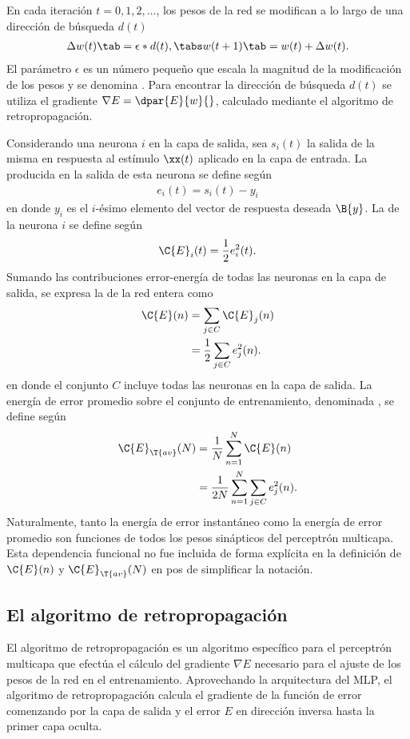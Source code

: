 En cada iteración $t=0,1,2,\ldots$, los pesos de la red
se modifican a lo largo de una dirección de búsqueda
$d(t)$ %
%
\begin{align}
  \Delta w(t)\tab=\epsilon * d(t), \tabs w(t+1) \tab= w(t)+\Delta w(t).
\end{align}
%
El parámetro $\epsilon$ es un número pequeño que escala la magnitud de
la modificación de los pesos y se denomina .  Para encontrar la dirección de búsqueda $d(t)$ se
utiliza el gradiente $\nabla{}E=\dpar{E}{w}{}$, calculado mediante el
algoritmo de retropropagación.

Considerando una neurona $i$ en la capa de salida, sea $s_i(t)$ la
salida de la misma en respuesta al estímulo $\xx(t)$ aplicado en la
capa de entrada. La  producida en la salida de esta
neurona se define según
%
\begin{align}\label{4.2}
  e_i(t)=s_{i}(t)-y_{i}
\end{align}
%
en donde $y_{i}$ es el $i$-ésimo elemento del vector de respuesta
deseada $\B{y}$. La  de la neurona
$i$ se define según
%
\begin{align}
\label{4.3}
  \C{E}_i(t)=\frac{1}{2}e^2_i(t).
\end{align}
%
Sumando las contribuciones error-energía de todas las neuronas en la
capa de salida, se expresa la 
de la red entera como
%
\begin{align}
\label{4.4}
  \C{E}(n)&=\sum_{j\in C}\C{E}_j(n) \\
  &=\frac{1}{2}\sum_{j\in C}e^2_j(n).
\end{align}
%
en donde el conjunto $C$ incluye todas las neuronas en la capa de
salida. La energía de error promedio sobre el conjunto de entrenamiento,
denominada , se define según
%
\begin{align}
\label{4.5}
  \C{E}_{\T{av}}(N)&=\frac{1}{N}\sum_{n=1}^N\C{E}(n) \\
  &=\frac{1}{2N} \sum_{n=1}^N \sum_{j\in C}e^2_j(n).
\end{align}
%
Naturalmente, tanto la energía de error instantáneo como la energía de
error promedio son funciones de todos los pesos sinápticos del
perceptrón multicapa. Esta dependencia funcional no fue incluida de
forma explícita en la definición de $\C{E}(n)$ y $\C{E}_{\T{av}}(N)$
en pos de simplificar la notación.
%
%
\subsection{El algoritmo de retropropagación}
%
El algoritmo de retropropagación es un algoritmo específico para el
perceptrón multicapa que efectúa el cálculo del gradiente $\nabla E$
necesario para el ajuste de los pesos de la red en el entrenamiento.
Aprovechando la arquitectura del MLP, el algoritmo de retropropagación
calcula el gradiente de la función de error comenzando por la capa de
salida y  el error $E$ en dirección inversa hasta la
primer capa oculta.

